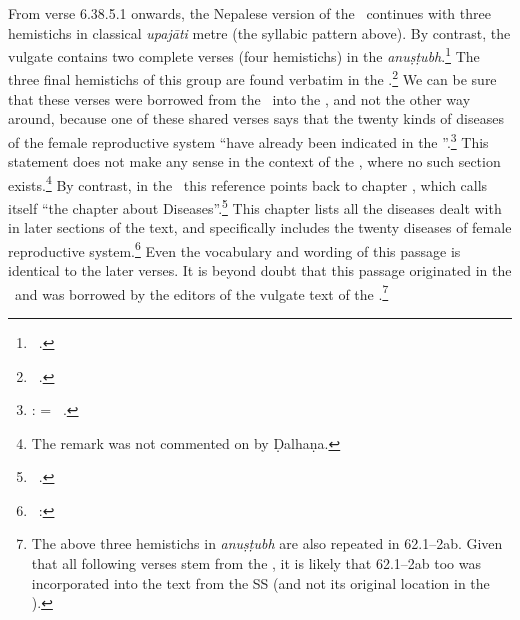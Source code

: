 From verse 6.38.5.1 onwards, the Nepalese version of the \SS\ continues with
three hemistichs in classical \emph{upajāti} metre (the syllabic pattern
above). By contrast, the vulgate contains two complete verses (four
hemistichs) in the \emph{anuṣṭubh}.\footnote{\SS\ .}
    The three final hemistichs of this group are found verbatim in the
    \CS.\footnote{\CS\ .} We can be sure that these verses
        were borrowed from the \CS\ into the \SS, and not the other way around,
        because one of these shared verses says that the twenty kinds of diseases of
        the female reproductive system “have already been indicated in the
        \emph{}”.\footnote{:  = \CS\ .} This 
                statement does not 
                make any
                sense  in the context of the \SS, where no such section 
                exists.\footnote{The
                    remark was not commented on by Ḍalhaṇa.}  By contrast, in the \CS\ 
                    this
                    reference points back to chapter , which calls 
                    itself
                    “the chapter about Diseases”.\footnote{\CS\ .} 
                    This
                        chapter lists all the diseases dealt with in later sections of the text, 
                        and
                        specifically includes the twenty diseases of female reproductive
                        system.\footnote{\CS\ \Ca{1.19.3}{110}: 
                        \dev{viṃśatiryonivyāpadaḥ/}}  Even
                            the vocabulary and wording of this passage is identical to the 
                            later verses.
                            It is beyond doubt that this passage originated in the \CS\ and 
                            was borrowed
                            by the editors of the vulgate text of the \SS.\footnote{The above 
                            three
                                hemistichs in \emph{anuṣṭubh} are also repeated in 
                                \cite{madhava} 62.1--2ab.
                                Given that all following verses stem from the \SS, it is likely 
                                that
                                \cite{madhava} 62.1--2ab too was incorporated into the text 
                                from the SS (and
                                not its original location in the \CS).}
    
